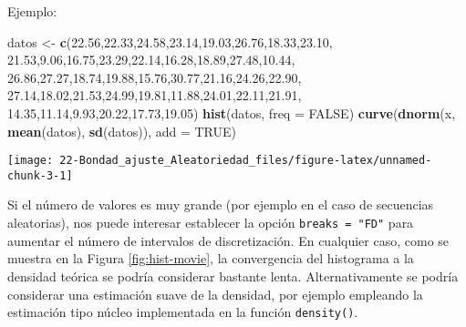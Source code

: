 \documentclass[
]{book}
\newenvironment{Shaded}{\begin{snugshade}}{\end{snugshade}}
\newcommand{\DataTypeTok}[1]{\textcolor[rgb]{0.13,0.29,0.53}{#1}}
\newcommand{\FloatTok}[1]{\textcolor[rgb]{0.00,0.00,0.81}{#1}}
\newcommand{\KeywordTok}[1]{\textcolor[rgb]{0.13,0.29,0.53}{\textbf{#1}}}
\newcommand{\NormalTok}[1]{#1}
\newcommand{\OtherTok}[1]{\textcolor[rgb]{0.56,0.35,0.01}{#1}}
\newcommand{\StringTok}[1]{\textcolor[rgb]{0.31,0.60,0.02}{#1}}
\theoremstyle{break}
\theoremstyle{definition}
\theoremstyle{definition}
\theoremstyle{definition}
\theoremstyle{remark}
\begin{document}
Ejemplo:

\begin{Shaded}
\begin{Highlighting}[]
\NormalTok{datos <-}\StringTok{ }\KeywordTok{c}\NormalTok{(}\FloatTok{22.56}\NormalTok{,}\FloatTok{22.33}\NormalTok{,}\FloatTok{24.58}\NormalTok{,}\FloatTok{23.14}\NormalTok{,}\FloatTok{19.03}\NormalTok{,}\FloatTok{26.76}\NormalTok{,}\FloatTok{18.33}\NormalTok{,}\FloatTok{23.10}\NormalTok{,}
  \FloatTok{21.53}\NormalTok{,}\FloatTok{9.06}\NormalTok{,}\FloatTok{16.75}\NormalTok{,}\FloatTok{23.29}\NormalTok{,}\FloatTok{22.14}\NormalTok{,}\FloatTok{16.28}\NormalTok{,}\FloatTok{18.89}\NormalTok{,}\FloatTok{27.48}\NormalTok{,}\FloatTok{10.44}\NormalTok{,}
  \FloatTok{26.86}\NormalTok{,}\FloatTok{27.27}\NormalTok{,}\FloatTok{18.74}\NormalTok{,}\FloatTok{19.88}\NormalTok{,}\FloatTok{15.76}\NormalTok{,}\FloatTok{30.77}\NormalTok{,}\FloatTok{21.16}\NormalTok{,}\FloatTok{24.26}\NormalTok{,}\FloatTok{22.90}\NormalTok{,}
  \FloatTok{27.14}\NormalTok{,}\FloatTok{18.02}\NormalTok{,}\FloatTok{21.53}\NormalTok{,}\FloatTok{24.99}\NormalTok{,}\FloatTok{19.81}\NormalTok{,}\FloatTok{11.88}\NormalTok{,}\FloatTok{24.01}\NormalTok{,}\FloatTok{22.11}\NormalTok{,}\FloatTok{21.91}\NormalTok{,}
  \FloatTok{14.35}\NormalTok{,}\FloatTok{11.14}\NormalTok{,}\FloatTok{9.93}\NormalTok{,}\FloatTok{20.22}\NormalTok{,}\FloatTok{17.73}\NormalTok{,}\FloatTok{19.05}\NormalTok{)}
\KeywordTok{hist}\NormalTok{(datos, }\DataTypeTok{freq =} \OtherTok{FALSE}\NormalTok{)}
\KeywordTok{curve}\NormalTok{(}\KeywordTok{dnorm}\NormalTok{(x, }\KeywordTok{mean}\NormalTok{(datos), }\KeywordTok{sd}\NormalTok{(datos)), }\DataTypeTok{add =} \OtherTok{TRUE}\NormalTok{)}
\end{Highlighting}
\end{Shaded}

\begin{center}\texttt{[image: 22-Bondad\_ajuste\_Aleatoriedad\_files/figure-latex/unnamed-chunk-3-1]} \end{center}

Si el número de valores es muy grande (por ejemplo en el caso de secuencias aleatorias), nos puede interesar establecer la opción \texttt{breaks\ =\ "FD"} para aumentar el número de intervalos de discretización.
En cualquier caso, como se muestra en la Figura \ref{fig:hist-movie}, la convergencia del histograma a la densidad teórica se podría considerar bastante lenta.
Alternativamente se podría considerar una estimación suave de la densidad, por ejemplo empleando la estimación tipo núcleo implementada en la función \texttt{density()}.
\end{document}
